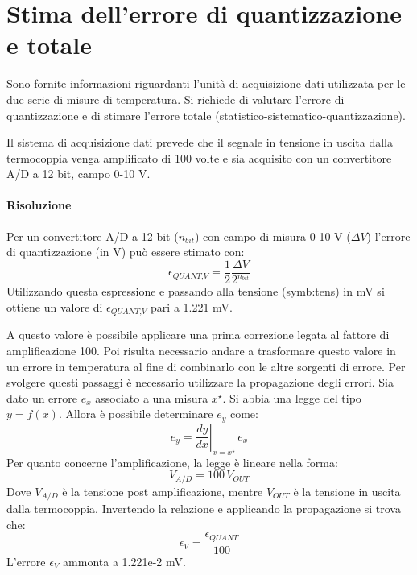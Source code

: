 \clearpage
\section{Stima dell'errore di quantizzazione e totale}
Sono fornite informazioni riguardanti l'unità di acquisizione dati utilizzata per le due serie di misure di temperatura. Si richiede di valutare l'errore di quantizzazione e di stimare l'errore totale (statistico-sistematico-quantizzazione).

Il sistema di acquisizione dati prevede che il segnale in tensione in uscita dalla termocoppia venga amplificato di 100 volte e sia acquisito con un convertitore A/D a 12 bit, campo 0-10 V.

\paragraph{Risoluzione}
Per un convertitore A/D a 12 bit ($n_{bit}$) con campo di misura 0-10 V ($\Delta V$) l'errore di quantizzazione (in V) può essere stimato con: 
\begin{equation}
	\epsilon_{\textit{QUANT,V}} = \frac{1}{2} \frac{\Delta V}{2^{n_{bit}}}
\end{equation}
Utilizzando questa espressione e passando alla tensione (\gls{symb:tens}) in mV si ottiene un valore di $	\epsilon_{\textit{QUANT,V}} $ pari a 1.221 mV. 

A questo valore è possibile applicare una prima correzione legata al fattore di amplificazione 100. Poi risulta necessario andare a trasformare questo valore in un errore in temperatura al fine di combinarlo con le altre sorgenti di errore. 
Per svolgere questi passaggi è necessario utilizzare la propagazione degli errori. Sia dato un errore $e_x$ associato a una misura $x^\star$. Si abbia una legge del tipo $y=f(x)$. Allora è possibile determinare $e_y$ come:
\begin{equation}
	e_y = \left. \frac{dy}{dx} \right\vert _{x=x^\star} \, e_x
\end{equation}
Per quanto concerne l'amplificazione, la legge è lineare nella forma:
\begin{equation}
	V_{A/D} = 100\, V_{OUT}
\end{equation}
Dove $V_{A/D}$ è la tensione post amplificazione, mentre $V_{OUT}$ è la tensione in uscita dalla termocoppia. Invertendo la relazione e applicando la propagazione si trova che:
\begin{equation}
	\epsilon_{\textit{V}} = \frac{\epsilon_{\textit{QUANT}}}{100}
\end{equation}
L'errore $\epsilon_{\textit{V}}$ ammonta a 1.221e-2 mV.

